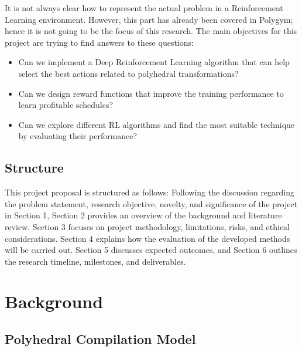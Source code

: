 \documentclass[logo,msc]{infthesis}           %
\begin{document}
It is not always clear how to represent the actual problem in a Reinforcement Learning environment. However, this part has already been covered in Polygym\cite{9563041}; hence it is not going to be the focus of this research. The main objectives for this project are trying to find answers to these questions:
\begin{itemize}

    \item Can we implement a Deep Reinforcement Learning algorithm that can help select the best actions related to polyhedral transformations? 
    \item Can we design reward functions that improve the training performance to learn profitable schedules?
    \item Can we explore different RL algorithms and find the most suitable technique by evaluating their performance?


\end{itemize}

\section{Structure}

This project proposal is structured as follows: Following the discussion regarding the problem statement, research objective, novelty, and significance of the project in Section 1, Section 2 provides an overview of the background and literature review. Section 3 focuses on project methodology, limitations, risks, and ethical considerations. Section 4 explains how the evaluation of the developed methods will be carried out. Section 5 discusses expected outcomes, and Section 6 outlines the research timeline, milestones, and deliverables.

\chapter{Background}

\section{Polyhedral Compilation Model}
\end{document}

